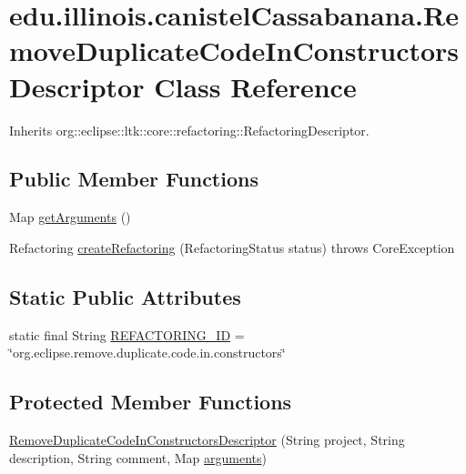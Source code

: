 \hypertarget{classedu_1_1illinois_1_1canistelCassabanana_1_1RemoveDuplicateCodeInConstructorsDescriptor}{
\section{edu.illinois.canistelCassabanana.RemoveDuplicateCodeInConstructorsDescriptor Class Reference}
\label{classedu_1_1illinois_1_1canistelCassabanana_1_1RemoveDuplicateCodeInConstructorsDescriptor}
}


Inherits org::eclipse::ltk::core::refactoring::RefactoringDescriptor.

\subsection*{Public Member Functions}
\begin{DoxyCompactItemize}
\item 
Map \hyperlink{classedu_1_1illinois_1_1canistelCassabanana_1_1RemoveDuplicateCodeInConstructorsDescriptor_a689124338a375f2d8d437c723b8adaf4}{getArguments} ()
\item 
Refactoring \hyperlink{classedu_1_1illinois_1_1canistelCassabanana_1_1RemoveDuplicateCodeInConstructorsDescriptor_ad1ff60e6ae3df160354905a785ca21b7}{createRefactoring} (RefactoringStatus status)  throws CoreException 
\end{DoxyCompactItemize}
\subsection*{Static Public Attributes}
\begin{DoxyCompactItemize}
\item 
static final String \hyperlink{classedu_1_1illinois_1_1canistelCassabanana_1_1RemoveDuplicateCodeInConstructorsDescriptor_a9ad2a0ed594137b3a3bb13a9e318152a}{REFACTORING\_\-ID} = \char`\"{}org.eclipse.remove.duplicate.code.in.constructors\char`\"{}
\end{DoxyCompactItemize}
\subsection*{Protected Member Functions}
\begin{DoxyCompactItemize}
\item 
\hyperlink{classedu_1_1illinois_1_1canistelCassabanana_1_1RemoveDuplicateCodeInConstructorsDescriptor_a03adefebce93bafe7af0e387679b696b}{RemoveDuplicateCodeInConstructorsDescriptor} (String project, String description, String comment, Map \hyperlink{classedu_1_1illinois_1_1canistelCassabanana_1_1RemoveDuplicateCodeInConstructorsDescriptor_aa4fa551e012664ff7066622e24ceb27c}{arguments})
\end{DoxyCompactItemize}
